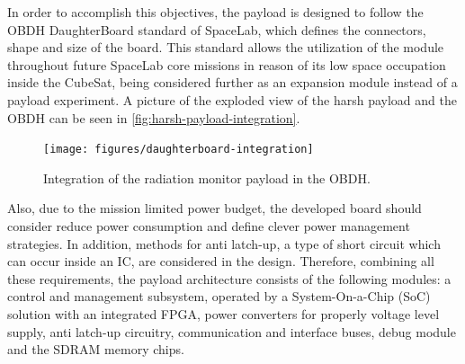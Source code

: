 In order to accomplish this objectives, the payload is designed to follow the OBDH DaughterBoard standard of SpaceLab, which defines the connectors, shape and size of the board. This standard allows the utilization of the module throughout future SpaceLab core missions in reason of its low space occupation inside the CubeSat, being considered further as an expansion module instead of a payload experiment. A picture of the exploded view of the harsh payload and the OBDH can be seen in \autoref{fig:harsh-payload-integration}.

\begin{figure}[!ht]
    \begin{center}
        \texttt{[image: figures/daughterboard-integration]}
        \caption{Integration of the radiation monitor payload in the OBDH.}
        \label{fig:harsh-payload-integration}
    \end{center}
\end{figure}

Also, due to the mission limited power budget, the developed board should consider reduce power consumption and define clever power management strategies. In addition, methods for anti latch-up, a type of short circuit which can occur inside an IC, are considered in the design. Therefore, combining all these requirements, the payload architecture consists of the following modules: a control and management subsystem, operated by a System-On-a-Chip (SoC) solution with an integrated FPGA, power converters for properly voltage level supply, anti latch-up circuitry, communication and interface buses, debug module and the SDRAM memory chips.
